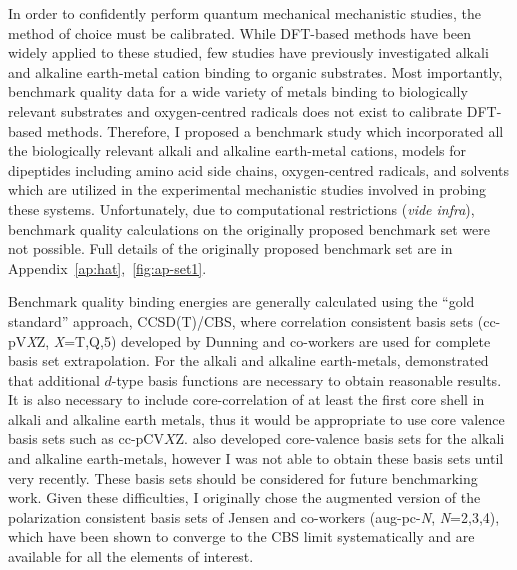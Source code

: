 In order to confidently perform quantum mechanical mechanistic studies, the
method of choice must be calibrated. While DFT-based methods have been widely
applied to these studied, few studies have previously investigated alkali and
alkaline earth-metal cation binding to organic substrates.\cite{Corral2003,
Suarez2011, Siu2001, Baldauf2013} Most importantly, benchmark quality data for
a wide variety of metals binding to biologically relevant substrates and
oxygen-centred radicals does not exist to calibrate DFT-based methods.
Therefore, I proposed a benchmark study which incorporated all the biologically
relevant alkali and alkaline earth-metal cations, models for dipeptides
including amino acid side chains, oxygen-centred radicals, and solvents which
are utilized in the experimental mechanistic studies involved in probing these
systems. Unfortunately, due to computational restrictions (\emph{vide infra}),
benchmark quality calculations on the originally proposed benchmark set were
not possible. Full details of the originally proposed benchmark set are in
Appendix~\ref{ap:hat},~\ref{fig:ap-set1}.

Benchmark quality binding energies are generally calculated using the ``gold
standard'' approach, CCSD(T)/CBS, where correlation consistent basis
sets\cite{Marshall2011, Rezac2013} (cc-pV\emph{X}Z, \emph{X}=T,Q,5) developed
by Dunning and\cite{Vydrov2006, Vydrov2006a} co-workers are used for complete
basis set extrapolation. For the alkali and alkaline earth-metals,
\citet{Iron2003} demonstrated that additional $d$-type basis functions are
necessary to obtain reasonable results. It is also necessary to include
core-correlation of at least the first core shell in alkali and alkaline earth
metals, thus it would be appropriate to use core valence basis sets such as
cc-pCV$X$Z.\cite{Peterson2002} \citet{Iron2003} also developed core-valence
basis sets for the alkali and alkaline earth-metals, however I was not able to
obtain these basis sets until very recently. These basis sets should be considered for
future benchmarking work. Given these difficulties, I originally chose the
augmented version of the polarization consistent basis sets of Jensen and
co-workers\cite{Jensen2001, Jensen2002, Jensen2002a, Jensen2003}
(aug-pc-\emph{N}, \emph{N}=2,3,4), which have been shown to converge to the CBS
limit systematically\cite{Kupka2007} and are available for all the elements of
interest.

